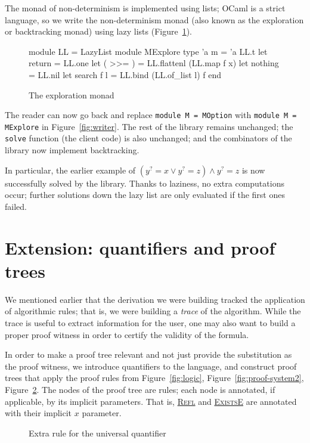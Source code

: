 \documentclass{easychair}
\def\li{\lstinline}
\let\TirName\textsc
\renewcommand{\DefTirName}[1]{\hyperlink{#1}{\TirName {#1}}}
\let\Rule\DefTirName
\newcommand{\fref}[1]{Figure~\ref{fig:#1}}
\newcommand{\f}[1]{\ensuremath{#1^?}} %
\begin{document}
The monad of non-determinism is implemented using lists; OCaml is a strict
language, so we write the non-determinism monad (also known as the exploration
or backtracking monad) using lazy lists (\fref{mexplore}).

\begin{figure}
  \centering
\begin{ocaml}
module LL = LazyList
module MExplore
  type 'a m = 'a LL.t
  let return = LL.one
  let ( >>= ) = LL.flattenl (LL.map f x)
  let nothing = LL.nil
  let search f l = LL.bind (LL.of_list l) f
end
\end{ocaml}
  \caption{The exploration monad}
  \label{fig:mexplore}
\end{figure}

The reader can now go back and replace \li+module M = MOption+ with
\li+module M = MExplore+ in \fref{writer}. The rest of the library remains
unchanged; the \li+solve+ function (the client code) is also unchanged; and the
combinators of the library now implement backtracking.

In particular, the earlier example of $(\f y = x \vee \f y = z) \wedge \f y = z$ is now successfully solved by the
library. Thanks to laziness, no extra computations occur; further solutions down
the lazy list are only evaluated if the first ones failed.

\section{Extension: quantifiers and proof trees}
\label{sec:generate-logical}

We mentioned earlier that the derivation we were building tracked the
application of algorithmic rules; that is, we were building a \emph{trace} of
the algorithm. While the trace is useful to extract information for the user,
one may also want to build a proper proof witness in order to certify the
validity of the formula.

In order to make a proof tree relevant and not just provide the substitution as
the proof witness, we introduce quantifiers to the language, and construct proof
trees that apply the proof rules from \fref{logic}, \fref{proof-system2},
\fref{logic-quantifiers}. The nodes of the proof tree are rules; each node is
annotated, if applicable, by its implicit parameters. That is, \Rule{Refl} and
\Rule{ExistsE} are annotated with their implicit $x$ parameter.

\begin{figure}
  \centering
  \begin{mathpar}
  \end{mathpar}
  \caption{Extra rule for the universal quantifier}
  \label{fig:logic-quantifiers}
\end{figure}
\end{document}
